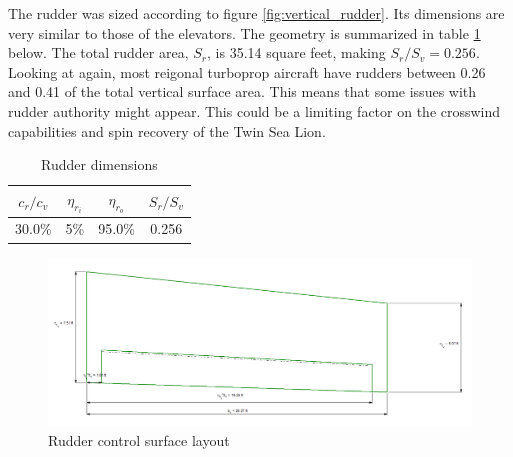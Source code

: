 \documentclass[conf]{new-aiaa}
\begin{document}
The rudder was sized according to figure \ref{fig:vertical_rudder}. Its dimensions are very similar to those of the elevators. The geometry is summarized in table \ref{tab:rudder_size_table} below. The total rudder area, $S_r$, is 35.14 square feet, making $S_r/S_v = 0.256$. Looking at \cite{orange_book} again, most reigonal turboprop aircraft have rudders between 0.26 and 0.41 of the total vertical surface area. This means that some issues with rudder authority might appear. This could be a limiting factor on the crosswind capabilities and spin recovery of the Twin Sea Lion.

\begin{table}[H]
\centering
\caption{Rudder dimensions}
\begin{tabular}{|c|c|c|c|}\hline
    $c_r/c_v$ & $\eta_{r_i}$ & $\eta_{r_o}$ & $S_r/S_v$ \\ \hline
    30.0\%    & 5\%          & 95.0\%       & 0.256     \\ \hline
\end{tabular}
\label{tab:rudder_size_table}
\end{table}

\begin{figure}[H]
    \includegraphics[width=\textwidth]{Report3Printouts/Empannage/Vertical_rudder_plot.png}
    \caption{Rudder control surface layout}
    \label{fig:vertical_rudder_plot}
\end{figure}



\end{document}
